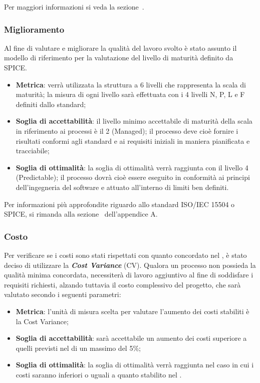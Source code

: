 Per maggiori informazioni si veda la sezione~.

\subsubsection{Miglioramento}
Al fine di valutare e migliorare la qualità del lavoro svolto è stato assunto il modello di riferimento per la valutazione del livello di maturità definito da SPICE.
\begin{itemize}
	\item \textbf{Metrica}: verrà utilizzata la struttura a 6 livelli che rappresenta la scala di maturità; la misura di ogni livello sarà effettuata con i 4 livelli N, P, L e F definiti dallo standard;
	\item \textbf{Soglia di accettabilità}: il livello minimo accettabile di maturità della scala in riferimento ai processi è il 2 (Managed); il processo deve cioè fornire i risultati conformi agli standard e ai requisiti iniziali in maniera pianificata e tracciabile;
	\item \textbf{Soglia di ottimalità}: la soglia di ottimalità verrà raggiunta con il livello 4 (Predictable); il processo dovrà cioè essere eseguito in conformità ai principi dell'ingegneria del software e attuato all'interno di limiti ben definiti.
\end{itemize}

Per informazioni più approfondite riguardo allo standard ISO/IEC 15504 o SPICE, si rimanda alla sezione~ dell'appendice A.

\subsubsection{Costo}
Per verificare se i costi sono stati rispettati con quanto concordato nel  \PdP{}, è stato deciso di utilizzare la \emph{\textbf{Cost Variance}} (CV).
Qualora un processo non possieda la qualità minima concordata, necessiterà di lavoro aggiuntivo al fine di soddisfare i requisiti richiesti, alzando tuttavia il costo complessivo del progetto, che sarà valutato secondo i seguenti parametri:
\begin{itemize}
	\item \textbf{Metrica}: l'unità di misura scelta per valutare l'aumento dei costi stabiliti è la Cost Variance;
	\item \textbf{Soglia di accettabilità}: sarà accettabile un aumento dei costi superiore a quelli previsti nel \PdP{} di un massimo del 5\%;
	\item \textbf{Soglia di ottimalità}: la soglia di ottimalità verrà raggiunta nel caso in cui i costi saranno inferiori o uguali a quanto stabilito nel \PdP{}.
\end{itemize}

